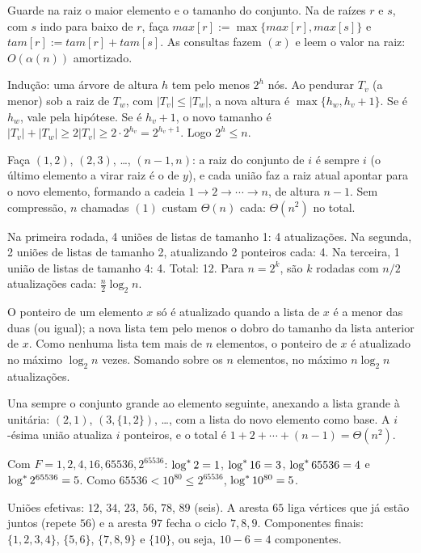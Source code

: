  Guarde na raiz o maior elemento e o tamanho do conjunto. Na \Union{} de raízes $r$ e $s$, com $s$ indo para baixo de $r$, faça $max[r]:=\max\{max[r],max[s]\}$ e $tam[r]:=tam[r]+tam[s]$. As consultas fazem \Find$(x)$ e leem o valor na raiz: $O(\alpha(n))$ amortizado.

 Indução: uma árvore de altura $h$ tem pelo menos $2^h$ nós. Ao pendurar $T_v$ (a menor) sob a raiz de $T_w$, com $|T_v|\le|T_w|$, a nova altura é $\max\{h_w,h_v+1\}$. Se é $h_w$, vale pela hipótese. Se é $h_v+1$, o novo tamanho é $|T_v|+|T_w|\ge2|T_v|\ge2\cdot2^{h_v}=2^{h_v+1}$. Logo $2^h\le n$.

 Faça \Union$(1,2)$, \Union$(2,3)$, \dots, \Union$(n-1,n)$: a raiz do conjunto de $i$ é sempre $i$ (o último elemento a virar raiz é o de $y$), e cada união faz a raiz atual apontar para o novo elemento, formando a cadeia $1\to2\to\cdots\to n$, de altura $n-1$. Sem compressão, $n$ chamadas \Find$(1)$ custam $\Theta(n)$ cada: $\Theta(n^2)$ no total.

 Na primeira rodada, 4 uniões de listas de tamanho 1: 4 atualizações. Na segunda, 2 uniões de listas de tamanho 2, atualizando 2 ponteiros cada: 4. Na terceira, 1 união de listas de tamanho 4: 4. Total: 12. Para $n=2^k$, são $k$ rodadas com $n/2$ atualizações cada: $\frac n2\log_2n$.

 O ponteiro de um elemento $x$ só é atualizado quando a lista de $x$ é a menor das duas (ou igual); a nova lista tem pelo menos o dobro do tamanho da lista anterior de $x$. Como nenhuma lista tem mais de $n$ elementos, o ponteiro de $x$ é atualizado no máximo $\log_2n$ vezes. Somando sobre os $n$ elementos, no máximo $n\log_2n$ atualizações.

 Una sempre o conjunto grande ao elemento seguinte, anexando a lista grande à unitária: \Union$(2,1)$, \Union$(3,\{1,2\})$, \dots, com a lista do novo elemento como base. A $i$-ésima união atualiza $i$ ponteiros, e o total é $1+2+\cdots+(n-1)=\Theta(n^2)$.

 Com $F=1,2,4,16,65536,2^{65536}$: $\log^{*}2=1$, $\log^{*}16=3$, $\log^{*}65536=4$ e $\log^{*}2^{65536}=5$. Como $65536<10^{80}\le2^{65536}$, $\log^{*}10^{80}=5$.

 Uniões efetivas: $12$, $34$, $23$, $56$, $78$, $89$ (seis). A aresta $65$ liga vértices que já estão juntos (repete $56$) e a aresta $97$ fecha o ciclo $7,8,9$. Componentes finais: $\{1,2,3,4\}$, $\{5,6\}$, $\{7,8,9\}$ e $\{10\}$, ou seja, $10-6=4$ componentes.

